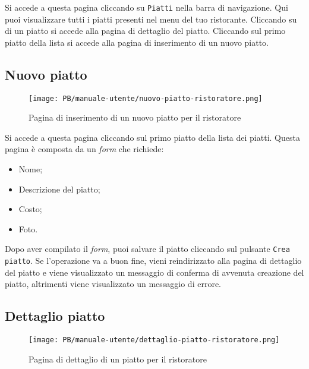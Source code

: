 Si accede a questa pagina cliccando su \texttt{Piatti} nella barra di
navigazione. Qui puoi visualizzare tutti i piatti presenti nel menu del tuo
ristorante. Cliccando su di un piatto si accede alla pagina di dettaglio del
piatto. Cliccando sul primo piatto della lista si accede alla pagina di
inserimento di un nuovo piatto.

\newpage
\subsection{Nuovo piatto}

\begin{figure}[htbp]
    \centering
	\texttt{[image: PB/manuale-utente/nuovo-piatto-ristoratore.png]}
    \caption{Pagina di inserimento di un nuovo piatto per il ristoratore}
\end{figure}

Si accede a questa pagina cliccando sul primo piatto della lista dei piatti.
Questa pagina è composta da un \textit{form} che richiede:
\begin{itemize}
	\item Nome;
	\item Descrizione del piatto;
	\item Costo;
	\item Foto.
\end{itemize}

Dopo aver compilato il \textit{form}, puoi salvare il piatto cliccando sul pulsante
\texttt{Crea piatto}. Se l'operazione va a buon fine, vieni reindirizzato alla
pagina di dettaglio del piatto e viene visualizzato un messaggio di conferma di
avvenuta creazione del piatto, altrimenti viene visualizzato un messaggio di
errore.

\subsection{Dettaglio piatto}

\begin{figure}[htbp]
    \centering
	\texttt{[image: PB/manuale-utente/dettaglio-piatto-ristoratore.png]}
    \caption{Pagina di dettaglio di un piatto per il ristoratore}
\end{figure}

